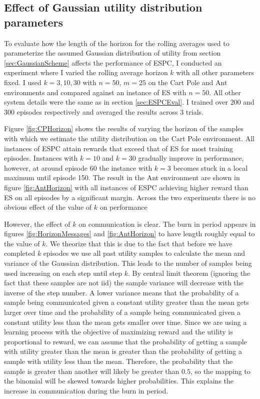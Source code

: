\subsection{Effect of Gaussian utility distribution parameters}

To evaluate how the length of the horizon for the rolling averages used to parameterize the assumed Gaussian distribution of utility from section \ref{sec:GaussianScheme} affects the performance of ESPC, I conducted an experiment where I varied the rolling average horizon $k$ with all other parameters fixed. I used $k=3,10,30$ with $n=50$, $m=25$ on the Cart Pole and Ant environments and compared against an instance of ES with $n=50$. All other system details were the same as in section \ref{sec:ESPCEval}. I trained over 200 and 300 episodes respectively and averaged the results across 3 trials.

Figure \ref{fig:CPHorizon} shows the results of varying the horizon of the samples with which we estimate the utility distribution on the Cart Pole environment. All instances of ESPC attain rewards that exceed that of ES for most training episodes. Instances with $k=10$ and $k=30$ gradually improve in performance, however, at around episode 60 the instance with $k=3$ becomes stuck in a local maximum until episode 150.
The result in the Ant environment are shown in figure \ref{fig:AntHorizon} with all instances of ESPC achieving higher reward than ES on all episodes by a significant margin. Across the two experiments there is no obvious effect of the value of $k$ on performance

However, the effect of $k$ on communication is clear. The burn in period appears in figures \ref{fig:HorizonMessages} and \ref{fig:AntHorizon} to have length roughly equal to the value of $k$. We theorize that this is due to the fact that before we have completed $k$ episodes we use all past utility samples to calculate the mean and variance of the Gaussian distribution. This leads to the number of samples being used increasing on each step until step $k$. By central limit theorem (ignoring the fact that these samples are not iid) the sample variance will decrease with the inverse of the step number. A lower variance means that the probability of a sample being communicated given a constant utility greater than the mean gets larger over time and the probability of a sample being communicated given a constant utility less than the mean gets smaller over time. Since we are using a learning process with the objective of maximizing reward and the utility is proportional to reward, we can assume that the probability of getting a sample with utility greater than the mean is greater than the probability of getting a sample with utility less than the mean. Therefore, the probability that the sample is greater than another will likely be greater than $0.5$, so the mapping to the binomial will be skewed towards higher probabilities. This explains the increase in communication during the burn in period.

